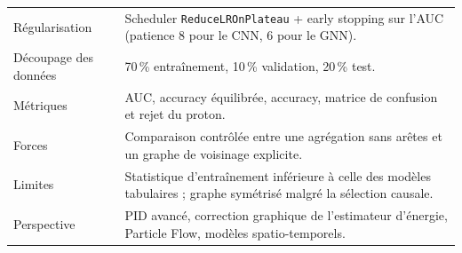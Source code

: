 \begin{table}[H]
\begin{tabularx}{\textwidth}{>{\raggedright\arraybackslash}p{4.4cm}X}
Régularisation &
Scheduler \texttt{ReduceLROnPlateau} + early stopping sur l'AUC (patience 8 pour le CNN, 6 pour le GNN). \\

Découpage des données &
70\,\% entraînement, 10\,\% validation, 20\,\% test. \\

Métriques &
AUC, accuracy équilibrée, accuracy, matrice de confusion et rejet du proton. \\

Forces &
Comparaison contrôlée entre une agrégation sans arêtes et un graphe de voisinage explicite. \\

Limites &
Statistique d'entraînement inférieure à celle des modèles tabulaires ; graphe symétrisé malgré la sélection causale. \\

Perspective &
PID avancé, correction graphique de l'estimateur d'énergie, Particle Flow, modèles spatio-temporels. \\

\bottomrule
\end{tabularx}
\end{table}
